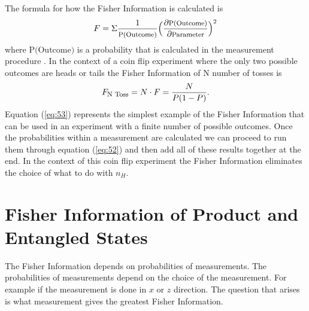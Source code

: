\documentclass[twocolumn]{article}
\begin{document}
The formula for how the Fisher Information is calculated is 
\begin{equation} \label{eq:52}
F=\Sigma\frac{1}{\text{\footnotesize{P(Outcome)}}}\Big(\frac{\partial \text{\footnotesize{P(Outcome)}}}{\partial\text{\footnotesize{Parameter}}}\Big)^2
\end{equation}
where $\text{P(Outcome)}$ is a probability that is calculated in the measurement procedure \cite{Paris}. In the context of a coin flip experiment where the only two possible outcomes are heads or tails the Fisher Information of N number of tosses is
\begin{equation} \label{eq:53}
F_{\text{\footnotesize{N Toss}}}=N\cdot F=\frac{N}{P(1-P)}.
\end{equation}
Equation (\ref{eq:53}) represents the simplest example of the Fisher Information that can be used in an experiment with a finite number of possible outcomes. Once the probabilities within a measurement are calculated we can proceed to run them through equation (\ref{eq:52}) and then add all of these results together at the end. In the context of this coin flip experiment the Fisher Information eliminates the choice of what to do with $n_H$.
\section*{Fisher Information of Product and Entangled States}
The Fisher Information depends on probabilities of measurements. The probabilities of measurements depend on the choice of the measurement. For example if the measurement is done in $x$ or $z$ direction. The question that arises is what measurement gives the greatest Fisher Information. 
\end{document}

